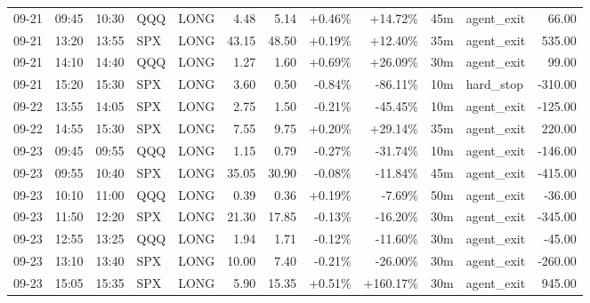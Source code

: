 \documentclass[11pt,a4paper,twoside]{article}
\begin{document}
\begin{center}
\begin{longtable}{>{\color{txtmain}}l l l l l r r r r r >{\color{txtmain}}l r}
09-21 & 09:45 & 10:30 & QQQ & LONG & 4.48 & 5.14 & \textcolor{wingreen}{+0.46\%} & \textcolor{wingreen}{+14.72\%} & 45m & agent\_exit & \textcolor{wingreen}{66.00} \\
09-21 & 13:20 & 13:55 & SPX & LONG & 43.15 & 48.50 & \textcolor{wingreen}{+0.19\%} & \textcolor{wingreen}{+12.40\%} & 35m & agent\_exit & \textcolor{wingreen}{535.00} \\
09-21 & 14:10 & 14:40 & QQQ & LONG & 1.27 & 1.60 & \textcolor{wingreen}{+0.69\%} & \textcolor{wingreen}{+26.09\%} & 30m & agent\_exit & \textcolor{wingreen}{99.00} \\
09-21 & 15:20 & 15:30 & SPX & LONG & 3.60 & 0.50 & \textcolor{lossred}{-0.84\%} & \textcolor{lossred}{-86.11\%} & 10m & hard\_stop & \textcolor{lossred}{-310.00} \\
09-22 & 13:55 & 14:05 & SPX & LONG & 2.75 & 1.50 & \textcolor{lossred}{-0.21\%} & \textcolor{lossred}{-45.45\%} & 10m & agent\_exit & \textcolor{lossred}{-125.00} \\
09-22 & 14:55 & 15:30 & SPX & LONG & 7.55 & 9.75 & \textcolor{wingreen}{+0.20\%} & \textcolor{wingreen}{+29.14\%} & 35m & agent\_exit & \textcolor{wingreen}{220.00} \\
09-23 & 09:45 & 09:55 & QQQ & LONG & 1.15 & 0.79 & \textcolor{lossred}{-0.27\%} & \textcolor{lossred}{-31.74\%} & 10m & agent\_exit & \textcolor{lossred}{-146.00} \\
09-23 & 09:55 & 10:40 & SPX & LONG & 35.05 & 30.90 & \textcolor{lossred}{-0.08\%} & \textcolor{lossred}{-11.84\%} & 45m & agent\_exit & \textcolor{lossred}{-415.00} \\
09-23 & 10:10 & 11:00 & QQQ & LONG & 0.39 & 0.36 & \textcolor{wingreen}{+0.19\%} & \textcolor{lossred}{-7.69\%} & 50m & agent\_exit & \textcolor{lossred}{-36.00} \\
09-23 & 11:50 & 12:20 & SPX & LONG & 21.30 & 17.85 & \textcolor{lossred}{-0.13\%} & \textcolor{lossred}{-16.20\%} & 30m & agent\_exit & \textcolor{lossred}{-345.00} \\
09-23 & 12:55 & 13:25 & QQQ & LONG & 1.94 & 1.71 & \textcolor{lossred}{-0.12\%} & \textcolor{lossred}{-11.60\%} & 30m & agent\_exit & \textcolor{lossred}{-45.00} \\
09-23 & 13:10 & 13:40 & SPX & LONG & 10.00 & 7.40 & \textcolor{lossred}{-0.21\%} & \textcolor{lossred}{-26.00\%} & 30m & agent\_exit & \textcolor{lossred}{-260.00} \\
09-23 & 15:05 & 15:35 & SPX & LONG & 5.90 & 15.35 & \textcolor{wingreen}{+0.51\%} & \textcolor{wingreen}{+160.17\%} & 30m & agent\_exit & \textcolor{wingreen}{945.00} \\

\end{longtable}
\end{center}
\end{document}
